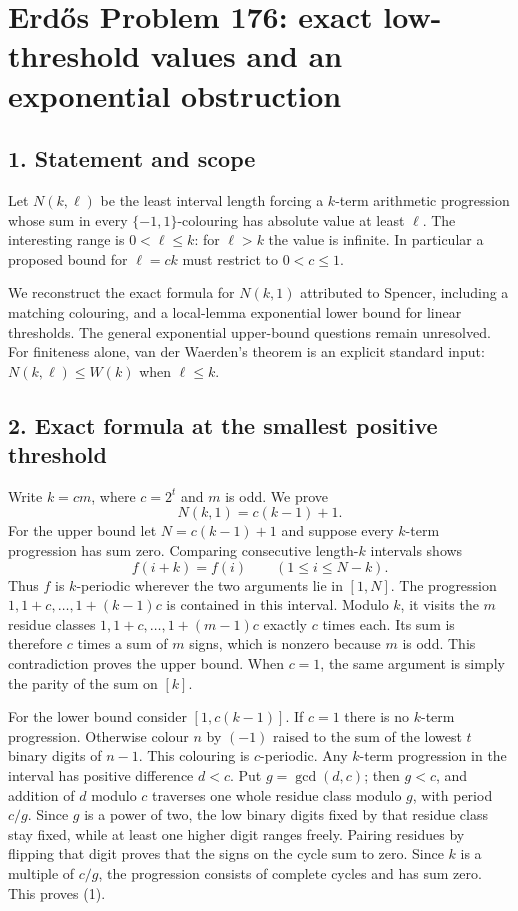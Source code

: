 \section*{Erd\H{o}s Problem 176: exact low-threshold values and an exponential obstruction}

\subsection*{1. Statement and scope}
Let $N(k,\ell)$ be the least interval length forcing a $k$-term arithmetic progression whose sum in every $\{-1,1\}$-colouring has absolute value at least $\ell$. The interesting range is $0<\ell\le k$: for $\ell>k$ the value is infinite. In particular a proposed bound for $\ell=ck$ must restrict to $0<c\le1$.

We reconstruct the exact formula for $N(k,1)$ attributed to Spencer, including a matching colouring, and a local-lemma exponential lower bound for linear thresholds. The general exponential upper-bound questions remain unresolved. For finiteness alone, van der Waerden's theorem is an explicit standard input: $N(k,\ell)\le W(k)$ when $\ell\le k$.

\subsection*{2. Exact formula at the smallest positive threshold}
Write $k=cm$, where $c=2^t$ and $m$ is odd. We prove
\[
 N(k,1)=c(k-1)+1.\tag{1}
\]
For the upper bound let $N=c(k-1)+1$ and suppose every $k$-term progression has sum zero. Comparing consecutive length-$k$ intervals shows
\[
 f(i+k)=f(i)\qquad(1\le i\le N-k).
\]
Thus $f$ is $k$-periodic wherever the two arguments lie in $[1,N]$. The progression $1,1+c,\ldots,1+(k-1)c$ is contained in this interval. Modulo $k$, it visits the $m$ residue classes $1,1+c,\ldots,1+(m-1)c$ exactly $c$ times each. Its sum is therefore $c$ times a sum of $m$ signs, which is nonzero because $m$ is odd. This contradiction proves the upper bound. When $c=1$, the same argument is simply the parity of the sum on $[k]$.

For the lower bound consider $[1,c(k-1)]$. If $c=1$ there is no $k$-term progression. Otherwise colour $n$ by $(-1)$ raised to the sum of the lowest $t$ binary digits of $n-1$. This colouring is $c$-periodic. Any $k$-term progression in the interval has positive difference $d<c$. Put $g=\gcd(d,c)$; then $g<c$, and addition of $d$ modulo $c$ traverses one whole residue class modulo $g$, with period $c/g$. Since $g$ is a power of two, the low binary digits fixed by that residue class stay fixed, while at least one higher digit ranges freely. Pairing residues by flipping that digit proves that the signs on the cycle sum to zero. Since $k$ is a multiple of $c/g$, the progression consists of complete cycles and has sum zero. This proves (1).

